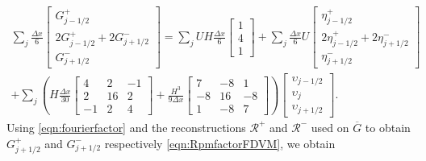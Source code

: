 \begin{multline*}
\sum_j \frac{\Delta x}{6}\begin{bmatrix} G^+_{j -1/2} \\2 G^+_{j -1/2}+2 G^-_{j +1/2} \\ G^-_{j +1/2} \end{bmatrix} = \sum_jUH \frac{\Delta x}{6}\begin{bmatrix} 1 \\4 \\ 1 \end{bmatrix} +  \sum_j \frac{\Delta x}{6}U\begin{bmatrix} \eta^+_{j -1/2} \\2 \eta^+_{j -1/2}+2 \eta^-_{j +1/2} \\ \eta^-_{j +1/2} \end{bmatrix}\\ + \sum_j \left(H\frac{\Delta x}{30}\begin{bmatrix} 4 &2 &-1 \\2 &16 &2  \\-1 &2 &4 \end{bmatrix} + \frac{H^3 }{9\Delta x}\begin{bmatrix} 7 &-8 &1  \\-8 &16 &-8  \\1 &-8 &7  \end{bmatrix} \right) \begin{bmatrix} \upsilon_{j -1/2} \\\upsilon_{j} \\ \upsilon_{j +1/2} \end{bmatrix}.
\end{multline*} 
Using \eqref{eqn:fourierfactor} and the reconstructions $\mathcal{R}^+$ and $\mathcal{R}^-$ used on $\overline{G}$ to obtain $G^+_{j +1/2}$ and $G^-_{j +1/2}$ respectively \eqref{eqn:RpmfactorFDVM}, we obtain


